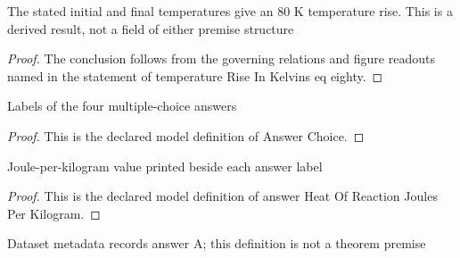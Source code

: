 \begin{lemma}
  \label{lem:physics:phyx-mini-0332:phyxminiproblems-problemphyxmini0332-temperatureriseinkelvins-eq-eighty}
  The stated initial and final temperatures give an 80 K temperature rise. This is a derived result, not a field of either premise structure
\end{lemma}
\begin{proof}
  The conclusion follows from the governing relations and figure readouts named in the statement of temperature Rise In Kelvins eq eighty.
\end{proof}
\begin{definition}
  \label{def:physics:phyx-mini-0332:phyxminiproblems-problemphyxmini0332-answerchoice}
  Labels of the four multiple-choice answers
\end{definition}
\begin{proof}
  This is the declared model definition of Answer Choice.
\end{proof}
\begin{definition}
  \label{def:physics:phyx-mini-0332:phyxminiproblems-problemphyxmini0332-answerheatofreactionjoulesperkilogram}
  Joule-per-kilogram value printed beside each answer label
\end{definition}
\begin{proof}
  This is the declared model definition of answer Heat Of Reaction Joules Per Kilogram.
\end{proof}
\begin{definition}
  \label{def:physics:phyx-mini-0332:phyxminiproblems-problemphyxmini0332-recordedanswerchoice}
  Dataset metadata records answer A; this definition is not a theorem premise
\end{definition}
